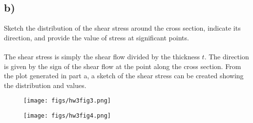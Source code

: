 \documentclass[12 pt]{article}
\begin{document}
\subsection*{b)}
Sketch the distribution of the shear stress around the cross section, indicate its direction, and
provide the value of stress at significant points. \\ \\
The shear stress is simply the shear flow divided by the thickness $t$. The direction is given by the sign of the shear
flow at the point along the cross section. From the plot generated in part a, a sketch of the shear stress can be
created showing the distribution and values.
\begin{figure}[H]
    \centering
    \texttt{[image: figs/hw3fig3.png]}
\end{figure}
\begin{figure}[H]
    \centering
    \texttt{[image: figs/hw3fig4.png]}
\end{figure}
\end{document}
